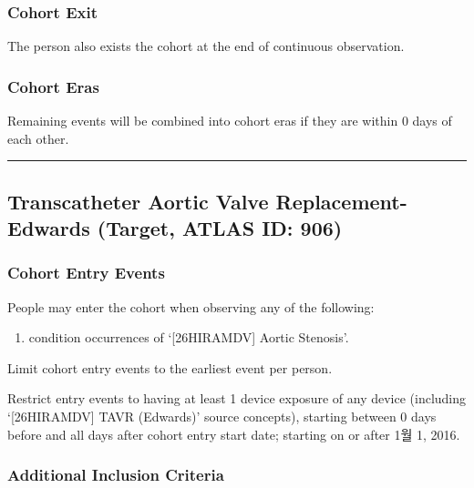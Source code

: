 \documentclass[
  12pt,
]{article}
\providecommand{\tightlist}{%
  \setlength{\itemsep}{0pt}\setlength{\parskip}{0pt}}
\begin{document}
\subsubsection{Cohort Exit}\label{cohort-exit-5}

The person also exists the cohort at the end of continuous observation.

\subsubsection{Cohort Eras}\label{cohort-eras-5}

Remaining events will be combined into cohort eras if they are within 0
days of each other.

\begin{center}\rule{0.5\linewidth}{0.5pt}\end{center}

\subsection{Transcatheter Aortic Valve Replacement-Edwards (Target,
ATLAS ID:
906)}\label{transcatheter-aortic-valve-replacement-edwards-target-atlas-id-906}

\subsubsection{Cohort Entry Events}\label{cohort-entry-events-6}

People may enter the cohort when observing any of the following:

\begin{enumerate}
\def\labelenumi{\arabic{enumi}.}
\tightlist
\item
  condition occurrences of `{[}26HIRAMDV{]} Aortic Stenosis'.
\end{enumerate}

Limit cohort entry events to the earliest event per person.

Restrict entry events to having at least 1 device exposure of any device
(including `{[}26HIRAMDV{]} TAVR (Edwards)' source concepts), starting
between 0 days before and all days after cohort entry start date;
starting on or after 1월 1, 2016.

\subsubsection{Additional Inclusion
Criteria}\label{additional-inclusion-criteria-6}
\end{document}
